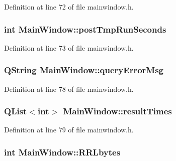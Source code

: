 \-Definition at line 72 of file mainwindow.\-h.

\hypertarget{classMainWindow_a6c309625ea8d8bd81d552a96ffbbf368}{
\subsubsection[{post\-Tmp\-Run\-Seconds}]{\setlength{\rightskip}{0pt plus 5cm}int {\bf \-Main\-Window\-::post\-Tmp\-Run\-Seconds}}}\label{classMainWindow_a6c309625ea8d8bd81d552a96ffbbf368}


\-Definition at line 73 of file mainwindow.\-h.

\hypertarget{classMainWindow_afbc3735a35d28cf9ce9a9873aacc4939}{
\subsubsection[{query\-Error\-Msg}]{\setlength{\rightskip}{0pt plus 5cm}\-Q\-String {\bf \-Main\-Window\-::query\-Error\-Msg}}}\label{classMainWindow_afbc3735a35d28cf9ce9a9873aacc4939}


\-Definition at line 78 of file mainwindow.\-h.

\hypertarget{classMainWindow_a69d381f82b82ca37620172b78d58c4ea}{
\subsubsection[{result\-Times}]{\setlength{\rightskip}{0pt plus 5cm}\-Q\-List$<$int$>$ {\bf \-Main\-Window\-::result\-Times}}}\label{classMainWindow_a69d381f82b82ca37620172b78d58c4ea}


\-Definition at line 79 of file mainwindow.\-h.

\hypertarget{classMainWindow_ac4e4dd0ba3dd8b958d2aec2271bfe299}{
\subsubsection[{\-R\-R\-Lbytes}]{\setlength{\rightskip}{0pt plus 5cm}int {\bf \-Main\-Window\-::\-R\-R\-Lbytes}}}\label{classMainWindow_ac4e4dd0ba3dd8b958d2aec2271bfe299}



